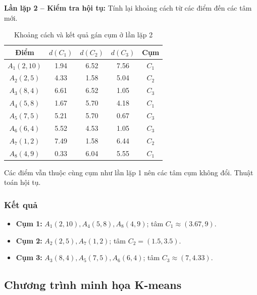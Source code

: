 \textbf{Lần lặp 2 -- Kiểm tra hội tụ:} Tính lại khoảng cách từ các điểm đến các tâm mới.
\begin{table}[H]
    \centering
    \small
    \begin{tabular}{|c|c|c|c|c|}
        \hline
        \textbf{Điểm} & \textbf{$d(C_1)$} & \textbf{$d(C_2)$} & \textbf{$d(C_3)$} & \textbf{Cụm} \\
        \hline
        $A_1(2,10)$ & 1.94 & 6.52 & 7.56 & $C_1$ \\ \hline
        $A_2(2,5)$ & 4.33 & 1.58 & 5.04 & $C_2$ \\ \hline
        $A_3(8,4)$ & 6.61 & 6.52 & 1.05 & $C_3$ \\ \hline
        $A_4(5,8)$ & 1.67 & 5.70 & 4.18 & $C_1$ \\ \hline
        $A_5(7,5)$ & 5.21 & 5.70 & 0.67 & $C_3$ \\ \hline
        $A_6(6,4)$ & 5.52 & 4.53 & 1.05 & $C_3$ \\ \hline
        $A_7(1,2)$ & 7.49 & 1.58 & 6.44 & $C_2$ \\ \hline
        $A_8(4,9)$ & 0.33 & 6.04 & 5.55 & $C_1$ \\ \hline
    \end{tabular}
    \caption{Khoảng cách và kết quả gán cụm ở lần lặp 2}
    \label{tab:kmeans-iteration-2}
\end{table}

Các điểm vẫn thuộc cùng cụm như lần lặp 1 nên các tâm cụm không đổi. Thuật toán hội tụ.

\subsubsection*{Kết quả}
\begin{itemize}
    \item \textbf{Cụm 1:} $A_1(2,10), A_4(5,8), A_8(4,9)$; tâm $C_1\approx(3.67,9)$.
    \item \textbf{Cụm 2:} $A_2(2,5), A_7(1,2)$; tâm $C_2=(1.5,3.5)$.
    \item \textbf{Cụm 3:} $A_3(8,4), A_5(7,5), A_6(6,4)$; tâm $C_3\approx(7,4.33)$.
\end{itemize}

\subsection{Chương trình minh họa K-means}


